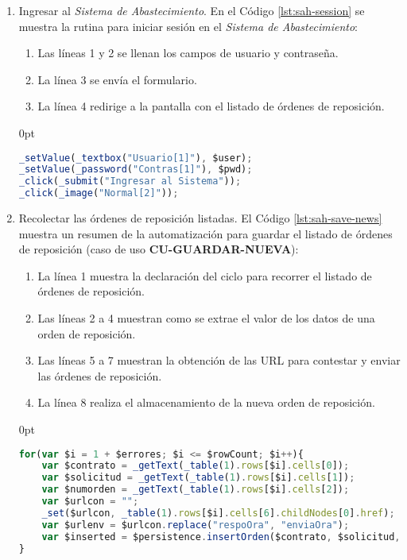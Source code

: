 \begin{enumerate}
	\item Ingresar al \textit{Sistema de Abastecimiento}. En el Código \ref{lst:sah-session} se muestra la rutina para iniciar sesión en el \textit{Sistema de Abastecimiento}:
	\begin{enumerate}
		\item Las líneas 1 y 2 se llenan los campos de usuario y contraseña.
		\item La línea 3 se envía el formulario.
		\item La línea 4 redirige a la pantalla con el listado de órdenes de reposición.  
	\end{enumerate}

\pagebreak
	\begin{adjustwidth}{\listingfixwidth}{0pt}
	\begin{lstlisting}[language=Javascript, caption={Inicio de sesión en el \textit{Sistema de Abastecimiento}.}, captionpos=b, label={lst:sah-session}]
_setValue(_textbox("Usuario[1]"), $user);
_setValue(_password("Contras[1]"), $pwd);
_click(_submit("Ingresar al Sistema"));
_click(_image("Normal[2]"));
	\end{lstlisting}
	\end{adjustwidth}

	\item Recolectar las órdenes de reposición listadas. El Código \ref{lst:sah-save-news} muestra un resumen de la automatización para guardar el listado de órdenes de reposición (caso de uso \textbf{CU-GUARDAR-NUEVA}):
	\begin{enumerate}
		\item La línea 1 muestra la declaración del ciclo para recorrer el listado de órdenes de reposición.
		\item Las líneas 2 a 4 muestran como se extrae el valor de los datos de una orden de reposición.
		\item Las líneas 5 a 7 muestran la obtención de las URL para contestar y enviar las órdenes de reposición.
		\item La línea 8 realiza el almacenamiento de la nueva orden de reposición. 
	\end{enumerate}
	\begin{adjustwidth}{\listingfixwidth}{0pt}
	\begin{lstlisting}[language=Javascript, caption={Guardar lista de órdenes de reposición.}, captionpos=b, label={lst:sah-save-news}]
for(var $i = 1 + $errores; $i <= $rowCount; $i++){
	var $contrato = _getText(_table(1).rows[$i].cells[0]);
	var $solicitud = _getText(_table(1).rows[$i].cells[1]);
	var $numorden = _getText(_table(1).rows[$i].cells[2]);
	var $urlcon = "";
	_set($urlcon, _table(1).rows[$i].cells[6].childNodes[0].href);
	var $urlenv = $urlcon.replace("respoOra", "enviaOra");
	var $inserted = $persistence.insertOrden($contrato, $solicitud, $numorden, $expedicion, $almacen, $urlcon, $urlenv, $idSesion);
}
	\end{lstlisting}
	\end{adjustwidth}


\end{enumerate}
